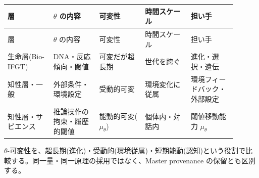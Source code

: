 \begin{longtable}{@{}p{0.18\linewidth}p{0.18\linewidth}p{0.18\linewidth}p{0.18\linewidth}p{0.18\linewidth}@{}}
\toprule
層 & $\theta$ の内容 & 可変性 & 時間スケール & 担い手 \\
\midrule
\endfirsthead
\toprule
層 & $\theta$ の内容 & 可変性 & 時間スケール & 担い手 \\
\midrule
\endhead
生命層(Bio-IFGT) & DNA・反応傾向・閾値 & 可変だが超長期 & 世代を跨ぐ & 進化・選択・遺伝 \\
知性層・一般 & 外部条件・環境設定 & 受動的可変 & 環境変化に従属 & 環境フィードバック・外部設定 \\
知性層・サピエンス & 推論操作の拘束・履歴的閾値 & 能動的可変($\mu_\theta$) & 個体内・対話内 & 閾値移動能力 $\mu_\theta$ \\
\bottomrule
\end{longtable}


$\theta$-可変性を、超長期(進化)・受動的(環境従属)・短期能動(認知)という役割で比較する。同一量・同一原理の採用ではなく、Master provenance の保留とも区別する。

\bigskip
